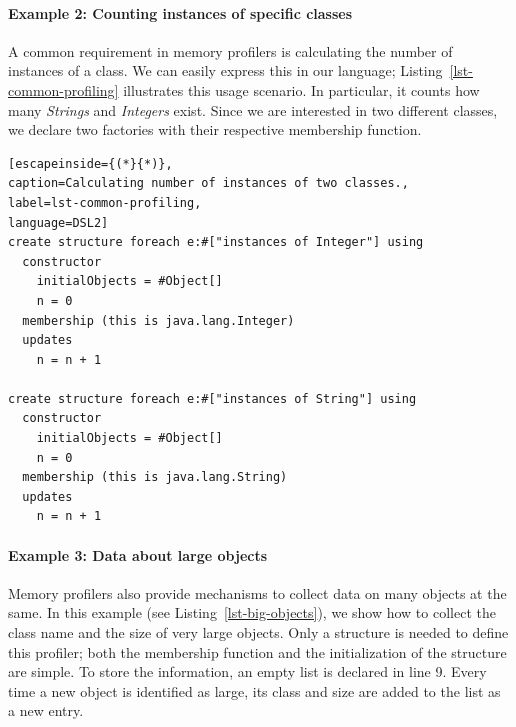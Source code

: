 \paragraph{Example 2: Counting instances of specific classes}
A common requirement in memory profilers is calculating the number of instances of a class.
We can easily express this in our language; Listing~\ref{lst-common-profiling} illustrates this usage scenario.
In particular, it counts how many \textit{Strings} and \textit{Integers} exist. 
Since we are interested in two different classes, we declare two factories with their respective membership function.
\begin{lstlisting}[escapeinside={(*}{*)},
caption=Calculating number of instances of two classes., 
label=lst-common-profiling,
language=DSL2]
create structure foreach e:#["instances of Integer"] using
  constructor
    initialObjects = #Object[]
    n = 0
  membership (this is java.lang.Integer)
  updates
    n = n + 1

create structure foreach e:#["instances of String"] using
  constructor
    initialObjects = #Object[]
    n = 0
  membership (this is java.lang.String)
  updates
    n = n + 1
\end{lstlisting}

\paragraph{Example 3: Data about large objects} 
Memory profilers also provide mechanisms to collect data on many objects at the same.
In this example (see Listing~\ref{lst-big-objects}), we show how to collect the class name and the size of very large objects.
Only a structure is needed to define this profiler; both the membership function and the initialization of the structure are simple.
To store the information, an empty list is declared in line 9.
Every time a new object is identified as large, its class and size are added to the list as a new entry. 

